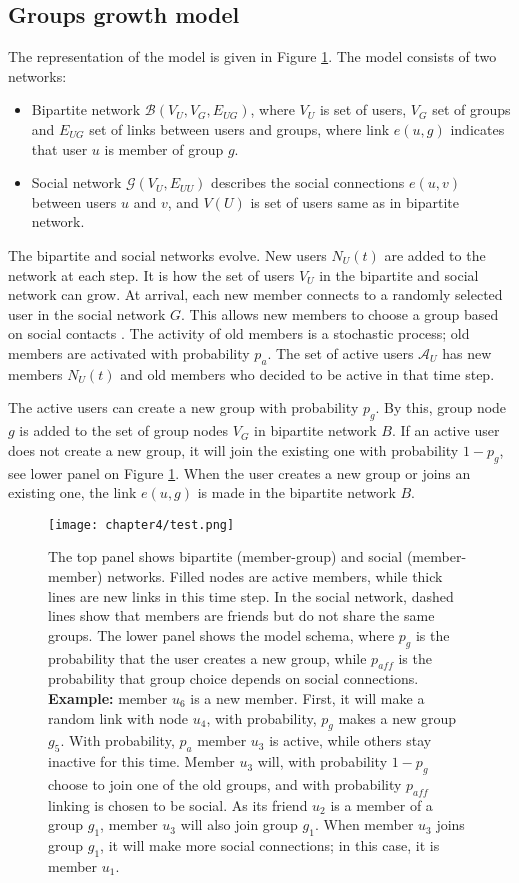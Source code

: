 \subsection{Groups growth model}

The representation of the model is given in Figure \ref{fig:schema}. The model consists of two networks:
\begin{itemize}
	\item Bipartite network $\mathcal{B}(V_{U}, V_{G}, E_{UG})$, where $V_U$ is set of users, $V_G$ set of groups and $E_{UG}$ set of links between users and groups, where link $e(u,g)$ indicates that user $u$ is member of group $g$.
	\item Social network $\mathcal{G}(V_{U},E_{UU})$ describes the social connections $e(u, v)$ between users $u$ and $v$, and  $V(U)$ is set of users same as in bipartite network. 
\end{itemize}

The bipartite and social networks evolve. New users $N_U(t)$ are added to the network at each step. It is how the set of users $V_U$ in the bipartite and social network can grow. At arrival, each new member connects to a randomly selected user in the social network $G$. This allows new members to choose a group based on social contacts \cite{kairam2012life}. The activity of old members is a stochastic process; old members are activated with probability $p_a$. The set of active users $\mathcal{A}_{U}$ has new members $N_U(t)$ and old members who decided to be active in that time step.

The active users can create a new group with probability $p_g$. By this, group node $g$ is added to the set of group nodes $V_G$ in bipartite network $B$. If an active user does not create a new group, it will join the existing one with probability $1-p_g$, see lower panel on Figure \ref{fig:schema}. When the user creates a new group or joins an existing one, the link $e(u,g)$ is made in the bipartite network $B$.

\begin{figure}[h]
	\centering
	\texttt{[image: chapter4/test.png]}
	\caption[Bipartite groups growth model.]{The top panel shows bipartite (member-group) and social (member-member) networks. Filled nodes are active members, while thick lines are new links in this time step. In the social network, dashed lines show that members are friends but do not share the same groups. The lower panel shows the model schema, where $p_g$ is the probability that the user creates a new group, while $p_{aff}$ is the probability that group choice depends on social connections. \textbf{Example:} member $u_6$ is a new member. First, it will make a random link with node $u_4$, with probability, $p_g$ makes a new group $g_5$. With probability, $p_a$ member $u_3$ is active, while others stay inactive for this time. Member $u_3$ will, with probability $1-p_g$ choose to join one of the old groups, and with probability $p_{aff}$ linking is chosen to be social. As its friend $u_2$ is a member of a group $g_1$, member $u_3$ will also join group $g_1$. When member $u_3$ joins group $g_1$, it will make more social connections; in this case, it is member $u_1$.}
	\label{fig:schema}
\end{figure}

